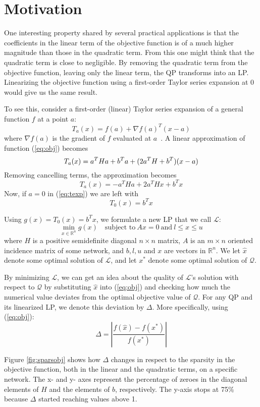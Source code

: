 \section{Motivation}
One interesting property shared by several practical applications is that the
coefficients in the linear term of the objective function is of a much higher
magnitude than those in the quadratic term.
From this one might think that the quadratic term is close to negligible.
By removing the quadratic term from the objective function, leaving only the
linear term, the QP transforms into an LP.
Linearizing the objective function using a first-order Taylor series expansion
at 0 would give us the same result.

To see this, consider a first-order (linear) Taylor series expansion of a
general function $f$ at a point $a$:
\[
T_a(x) = f(a) + \nabla f(a)^T(x-a)
\]
where $\nabla f(a)$ is the gradient of $f$ evaluated at $a$~\cite{apostol}.
A linear approximation of function (\ref{eq:obj}) becomes
\[
T_a(x) = a^THa + b^Ta + (2a^TH + b^T)(x - a) \\
\]
Removing cancelling terms, the approximation becomes
\begin{equation}
\label{eq:texp}
T_a(x) = - a^THa + 2a^THx + b^Tx
\end{equation}
Now, if $a = 0$ in (\ref{eq:texp}) we are left with
\[
T_0(x) = b^Tx
\]

Using $g(x) = T_0(x) = b^Tx$, we formulate a new LP that we call $\mathcal{L}$:
\[
\min_{x \in \mathbb{R}^n} g(x)
\quad \textrm{subject to}
~
Ax = 0
~
\textrm{and}
~
l \le x \le u
\]
where $H$ is a positive semidefinite diagonal $n \times n$ matrix, $A$ is an
$m \times n$ oriented incidence matrix of some network, and $b, l, u$ and $x$ are vectors in
$\mathbb{R}^n$.
We let $\hat{x}$ denote some optimal solution of $\mathcal{L}$, and let $x^*$
denote some optimal solution of $\mathcal{Q}$.

By minimizing $\mathcal{L}$, we can get an idea about the quality of
$\mathcal{L}$'s solution with respect to $\mathcal{Q}$ by substituting
$\hat{x}$ into (\ref{eq:obj}) and checking how much the numerical value
deviates from the optimal objective value of $\mathcal{Q}$.
For any QP and its linearized LP, we denote this deviation by $\Delta$.
More specifically, using (\ref{eq:obj}):
\[
\Delta = \left|\frac{f(\hat{x}) - f(x^*)}{f(x^*)}\right|
\]

Figure \ref{fig:sparsobj} shows how $\Delta$ changes in respect to the sparsity
in the objective function, both in the linear and the quadratic terms, on a
specific network. The x- and y- axes represent the percentage of zeroes in the
diagonal elements of $H$ and the elements of $b$, respectively. The y-axis
stops at 75\% because $\Delta$ started reaching values above 1.


